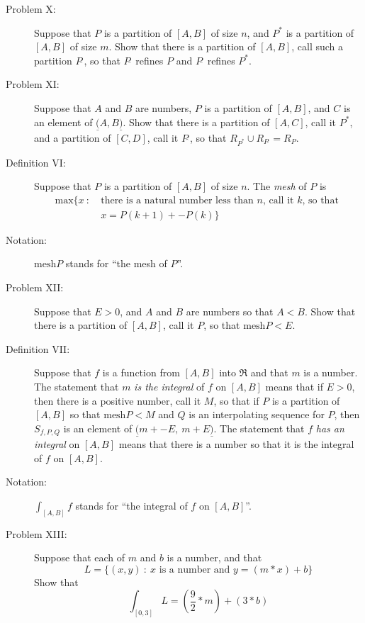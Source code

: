\documentclass{article}
\begin{document}
\begin{description}
  \item[Problem X:] Suppose that $P$ is a partition of $[A,B]$ of size $n$, and $P^*$ is a partition of $[A,B]$ of size $m$. Show that there is a partition of $[A,B]$, call such a partition $P\hat{\ }$, so that $P\hat{\ }$ refines $P$ and $P\hat{\ }$ refines $P^*$.

  \item[Problem XI:] Suppose that $A$ and $B$ are numbers, $P$ is a partition of $[A,B]$, and $C$ is an element of $\underline{(} A,B \underline{)}$. Show that there is a partition of $[A,C]$, call it $P^*$, and a partition of $[C,D]$, call it $P\hat{\ }$, so that $R_{P^*} \cup R_{P\hat{\ }} = R_{P}$.

  \item[Definition VI:] Suppose that $P$ is a partition of $[A,B]$ of size $n$. The \emph{mesh} of $P$ is 
    \begin{align*}
    \text{max} \{ x\ :\ & \text{there is a natural number less than $n$, call it $k$, so that } \\ 
                        & x = P(k+1) + -P(k) \}
    \end{align*}

  \item[Notation:] $\text{mesh}P$ stands for ``the mesh of $P$''.

  \item[Problem XII:] Suppose that $E > 0$, and $A$ and $B$ are numbers so that $A < B$. Show that there is a partition of $[A,B]$, call it $P$, so that $\text{mesh}P < E$.

  \item[Definition VII:] Suppose that $f$ is a function from $[A,B]$ into $\Re$ and that $m$ is a number. The statement that $m$ \emph{is the integral} of $f$ on $[A,B]$ means that if $E > 0$, then there is a positive number, call it $M$, so that if $P$ is a partition of $[A,B]$ so that $\text{mesh}P < M$ and $Q$ is an interpolating sequence for $P$, then $S_{f,P,Q}$ is an element of $\underline{(} m + -E, \ m + E \underline{)}$. The statement that $f$ \emph{has an integral} on $[A,B]$ means that there is a number so that it is the integral of $f$ on $[A,B]$.

  \item[Notation:] $\displaystyle{ \int_{[A,B]} f}$ stands for ``the integral of $f$ on $[A,B]$''.

  \item[Problem XIII:] Suppose that each of $m$ and $b$ is a number, and that 
    \begin{equation*}
    L = \{ (x,y)\ :\ x \text{ is a number and } y = (m*x) + b \}
    \end{equation*}
    Show that 
    \begin{equation*}
    \int_{[0,3]} L = \left( \frac{9}{2} * m \right) + (3*b)
    \end{equation*}


\end{description}
\end{document}
